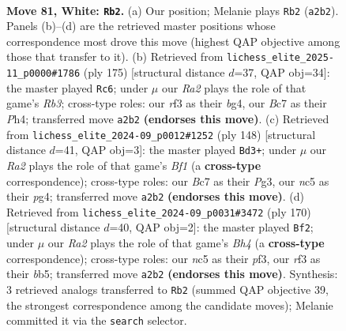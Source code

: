 \documentclass[11pt]{article}
\begin{document}
\clearpage

\begin{figure}[p]\centering
\begin{subfigure}{0.46\textwidth}\centering
\resizebox{\linewidth}{!}{%
\newchessgame
\chessboard[
  setfen={8/2B5/3pk2p/2n1p1b1/2K1P2p/5r2/R7/8 w - - 4 81},
  showmover=false,
  pgfstyle=straightmove, color=movearrow, markmove={a2-b2}
]}
\caption{}
\end{subfigure}\hfill
\begin{subfigure}{0.46\textwidth}\centering
\resizebox{\linewidth}{!}{%
\newchessgame
\chessboard[
  setfen={8/8/1r6/8/3kNpBp/3b1P1P/6P1/6K1 b - - 11 88},
  showmover=false,
  pgfstyle=straightmove, color=movearrow, markmove={b6-c6}
]}
\caption{}
\end{subfigure}
\\[4pt]
\begin{subfigure}{0.46\textwidth}\centering
\resizebox{\linewidth}{!}{%
\newchessgame
\chessboard[
  setfen={8/8/4b3/5p2/4k1p1/4PpP1/3K4/5B2 w - - 2 75},
  showmover=false,
  pgfstyle=straightmove, color=movearrow, markmove={f1-d3}
]}
\caption{}
\end{subfigure}\hfill
\begin{subfigure}{0.46\textwidth}\centering
\resizebox{\linewidth}{!}{%
\newchessgame
\chessboard[
  setfen={8/8/2p5/1bPp4/3Pk2B/5p2/3K4/8 w - - 60 86},
  showmover=false,
  pgfstyle=straightmove, color=movearrow, markmove={h4-f2}
]}
\caption{}
\end{subfigure}
\caption{\textbf{Move 81, White: \texttt{Rb2}.} (a) Our position; Melanie plays \texttt{Rb2} (\texttt{a2b2}). Panels (b)--(d) are the retrieved master positions whose correspondence most drove this move (highest QAP objective among those that transfer to it). (b) Retrieved from \texttt{lichess\_elite\_2025-11\_p0000\#1786} (ply 175) [structural distance $d$=37, QAP obj=34]: the master played \texttt{Rc6}; under $\mu$ our \emph{Ra2} plays the role of that game's \emph{Rb3}; cross-type roles: our \emph{r}f3 as their \emph{b}g4, our \emph{B}c7 as their \emph{P}h4; transferred move \texttt{a2b2} \textbf{(endorses this move)}. (c) Retrieved from \texttt{lichess\_elite\_2024-09\_p0012\#1252} (ply 148) [structural distance $d$=41, QAP obj=3]: the master played \texttt{Bd3+}; under $\mu$ our \emph{Ra2} plays the role of that game's \emph{Bf1} (a \textbf{cross-type} correspondence); cross-type roles: our \emph{B}c7 as their \emph{P}g3, our \emph{n}c5 as their \emph{p}g4; transferred move \texttt{a2b2} \textbf{(endorses this move)}. (d) Retrieved from \texttt{lichess\_elite\_2024-09\_p0031\#3472} (ply 170) [structural distance $d$=40, QAP obj=2]: the master played \texttt{Bf2}; under $\mu$ our \emph{Ra2} plays the role of that game's \emph{Bh4} (a \textbf{cross-type} correspondence); cross-type roles: our \emph{n}c5 as their \emph{p}f3, our \emph{r}f3 as their \emph{b}b5; transferred move \texttt{a2b2} \textbf{(endorses this move)}. Synthesis: 3 retrieved analogs transferred to \texttt{Rb2} (summed QAP objective 39, the strongest correspondence among the candidate moves); Melanie committed it via the \texttt{search} selector.}
\label{fig:thought-m160}
\end{figure}
\end{document}
